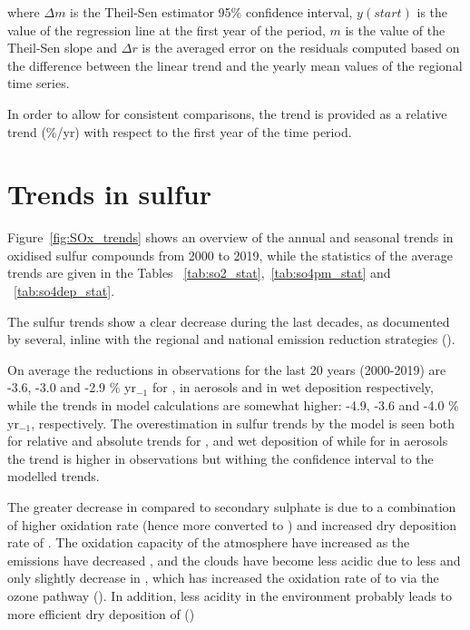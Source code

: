 where $\Delta m$ is the Theil-Sen estimator 95\% confidence interval, $y(start)$ is the value of the regression line at the first year of the period, $m$ is the value of the Theil-Sen slope and $\Delta r$ is the averaged error on the residuals computed based on the difference between the linear trend and the yearly mean values of the regional time series.

In order to allow for consistent comparisons, the trend is provided as a relative trend (\%/yr) with respect to the first year of the time period.



\section{\label{sec:Trends_sulfur}Trends in sulfur}

Figure~\ref{fig:SOx_trends} shows an overview of the annual and seasonal trends in oxidised sulfur compounds from 2000 to 2019, while the statistics of the average trends are given in the Tables ~\ref{tab:so2_stat},~\ref{tab:so4pm_stat} and ~\ref{tab:so4dep_stat}.

The sulfur trends show a clear decrease during the last decades, as documented by several, inline with the regional and national emission reduction strategies (\cite{aas2019global, Colette2012, Vivanco2018, Theobald2019, Colette2021, Banzhaf2015, torseth2012, Crippa2016}).

On average the reductions in observations for the last 20 years (2000-2019) are -3.6, -3.0 and -2.9  \% yr$_{-1}$ for \soii, \soiv in aerosols and in wet deposition respectively, while the trends in model calculations are somewhat higher: -4.9, -3.6 and -4.0 \% yr$_{-1}$, respectively. The overestimation in sulfur trends by the model is seen both for relative and absolute trends for \soii, and wet deposition of \soiv while for \soiv in aerosols the trend is higher in observations but withing the confidence interval to the modelled trends. 

The  greater decrease in \soii compared to secondary sulphate is due to a combination of higher oxidation rate (hence more \soii converted to \soiv) and increased dry deposition rate of \soii. The oxidation capacity of the atmosphere have increased as the emissions have decreased \cite{Dalsoren2016}, and the clouds have become less acidic due to less \soii and only slightly decrease in \nhiii, which has increased the oxidation rate of \soii to \soiv via the ozone pathway (\cite{Banzhaf2015, Redington2009}). In addition, less acidity in the environment probably leads to more efficient dry deposition of \soii (\cite{Fowler_et_al:2009}) 





